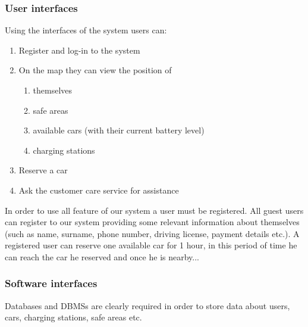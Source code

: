\subsubsection{User interfaces}
	Using the interfaces of the system users can:
	\begin{enumerate}
		\item Register and log-in to the system
		\item On the map they can view the position of
			\begin{enumerate}[label=\alph*)]
				\item themselves
				\item safe areas
				\item available cars (with their current battery level)
				\item charging stations
			\end{enumerate}
		\item Reserve a car
		\item Ask the customer care service for assistance 
	\end{enumerate}


	In order to use all feature of our system a user must be registered. All guest users can register to our system providing some relevant information about themselves (such as name, surname, phone number, driving license, payment details etc.). A registered user can reserve one available car for 1 hour, in this period of time he can reach the car he reserved and once he is nearby...

\subsubsection{Software interfaces}
Databases and DBMSs are clearly required in order to store data about users, cars, charging stations, safe areas etc.

